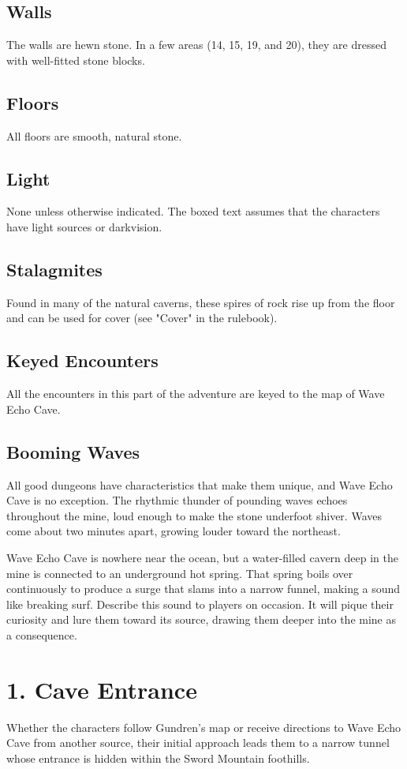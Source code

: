 \documentclass[10pt,a4paper,twoside,bg=print,twocolumn,openany,nodeprecatedcode]{dndbook}
\begin{document}
\subsection{Walls}
The walls are hewn stone. In a few areas (14, 15, 19, and 20), they are dressed with well-fitted stone blocks.

\subsection{Floors}
All floors are smooth, natural stone.

\subsection{Light}
None unless otherwise indicated. The boxed text assumes that the characters have light sources or darkvision.

\subsection{Stalagmites}
Found in many of the natural caverns, these spires of rock rise up from the floor and can be used for cover (see "Cover" in the rulebook).

\subsection{Keyed Encounters}
All the encounters in this part of the adventure are keyed to the map of Wave Echo Cave.

\subsection{Booming Waves}
All good dungeons have characteristics that make them unique, and Wave Echo Cave is no exception. The rhythmic thunder of pounding waves echoes throughout the mine, loud enough to make the stone underfoot shiver. Waves come about two minutes apart, growing louder toward the northeast.

Wave Echo Cave is nowhere near the ocean, but a water-filled cavern deep in the mine is connected to an underground hot spring. That spring boils over continuously to produce a surge that slams into a narrow funnel, making a sound like breaking surf. Describe this sound to players on occasion. It will pique their curiosity and lure them toward its source, drawing them deeper into the mine as a consequence.

\section{1. Cave Entrance}
Whether the characters follow Gundren's map or receive directions to Wave Echo Cave from another source, their initial approach leads them to a narrow tunnel whose entrance is hidden within the Sword Mountain foothills.
\end{document}

